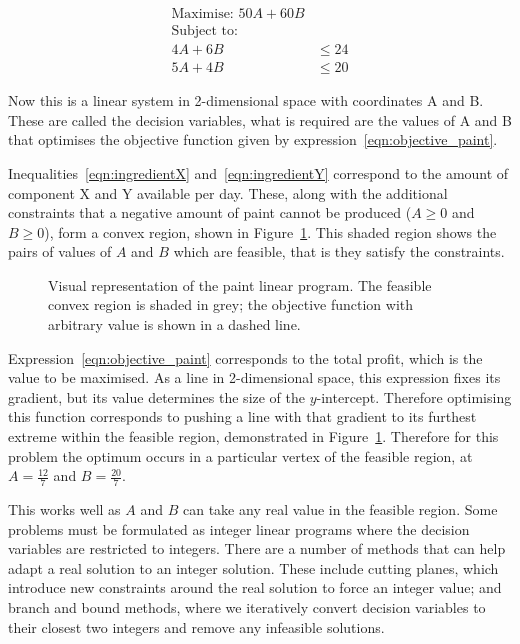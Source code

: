 \begin{align}
\text{Maximise: } 50 A + 60 B & \label{eqn:objective_paint} \\
\text{Subject to: } & \nonumber \\
4 A + 6 B &\leq 24 \label{eqn:ingredientX} \\
5 A + 4 B &\leq 20 \label{eqn:ingredientY}
\end{align}

Now this is a linear system in 2-dimensional space with coordinates A and B.
These are called the decision variables, what is required are the values of A
and B that optimises the objective function given by
expression~\ref{eqn:objective_paint}.

Inequalities~\ref{eqn:ingredientX} and~\ref{eqn:ingredientY} correspond to the
amount of component X and Y available per day. These, along with the additional
constraints that a negative amount of paint cannot be produced (\(A \geq 0\) and
\(B \geq 0\)), form a convex region, shown in Figure~\ref{fig:paint_lp}.
This shaded region shows the pairs of values of \(A\) and \(B\) which are
feasible, that is they satisfy the constraints.

\begin{figure}
\begin{center}

\end{center}
\caption{Visual representation of the paint linear program. The feasible convex
region is shaded in grey; the objective function with arbitrary value is shown
in a dashed line.}
\label{fig:paint_lp}
\end{figure}

Expression~\ref{eqn:objective_paint} corresponds to the total profit, which is
the value to be maximised. As a line in 2-dimensional space,
this expression fixes its gradient, but its value determines the size of the
\(y\)-intercept. Therefore optimising this function corresponds to pushing a line
with that gradient to its furthest extreme within the feasible region,
demonstrated in Figure~\ref{fig:paint_lp}.
Therefore for this problem the optimum occurs in a particular vertex of the
feasible region, at \(A = \frac{12}{7}\) and \(B = \frac{20}{7}\).

This works well as \(A\) and \(B\) can take any real value in the feasible region.
Some problems must be formulated as integer linear programs where the decision
variables are restricted to integers. There are a number of methods that can
help adapt a real solution to an integer solution. These include cutting
planes, which introduce new constraints around the real solution to force an
integer value; and branch and bound methods, where we iteratively convert
decision variables to their closest two integers and remove any infeasible
solutions\autocite{conforti2014integer}.

